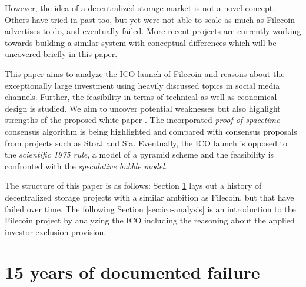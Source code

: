 \documentclass[journal]{IEEEtran}
\begin{document}
However, the idea of a decentralized storage market is not a novel concept.
Others\cite{tribler}\cite{mojo-nation} have tried in past too, but yet were not able to scale as much as Filecoin advertises to do, and eventually failed.
More recent projects\cite{storj}\cite{sia} are currently working towards building a similar system with conceptual differences which will be uncovered briefly in this paper.

This paper aims to analyze the ICO launch of Filecoin and reasons about the exceptionally large investment using heavily discussed topics in social media channels.
Further, the feasibility in terms of technical as well as economical design is studied.
We aim to uncover potential weaknesses but also highlight strengths of the proposed white-paper \cite{filecoin}.
The incorporated \textit{proof-of-spacetime} consensus algorithm is being highlighted and compared with consensus proposals from projects such as StorJ and Sia.
Eventually, the ICO launch is opposed to the \textit{scientific 1975 rule}, a model of a pyramid scheme\cite{pyramid-scheme} and the feasibility is confronted with the \textit{speculative bubble model}\cite{bubble}.

The structure of this paper is as follows: Section \ref{sec:documented-failure} lays out a history of decentralized storage projects with a similar ambition as Filecoin, but that have failed over time. 
The following Section \ref{sec:ico-analysis} is an introduction to the Filecoin project by analyzing the ICO including the reasoning about the applied investor exclusion provision.


\section{15 years of documented failure}
\label{sec:documented-failure}
\end{document}
